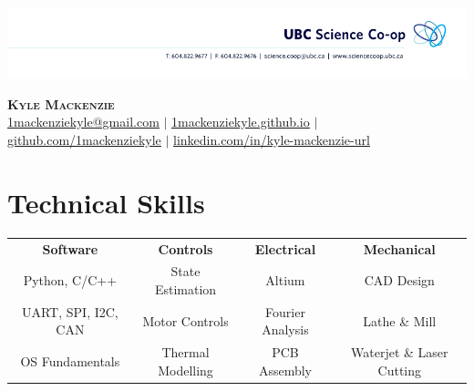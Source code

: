 \documentclass[letterpaper,11pt]{article}
\begin{document}

\begin{center}
\vspace*{-1.5cm}
    \centerline{\includegraphics[width=\paperwidth]{head}}
    \textbf{\Huge \scshape Kyle Mackenzie} \\ \vspace{1pt}
    \href{mailto:1mackenziekyle@gmail.com}{\underline{1mackenziekyle@gmail.com}} $|$
    \small \href{https://1mackenziekyle.github.io}{\underline{1mackenziekyle.github.io}} $|$
    \small \href{https://github.com/1mackenziekyle}{\underline{github.com/1mackenziekyle}} $|$
    \href{https://www.linkedin.com/in/kyle-mackenzie-url/}{\underline{linkedin.com/in/kyle-mackenzie-url}}  
    
    
\end{center}

 
  
%
\section{Technical Skills}
\begin{center}
    \begin{tabular*}{\textwidth}{@{\extracolsep{\fill}}cccc}
        \textbf{Software} & \textbf{Controls} & \textbf{Electrical} & \textbf{Mechanical} \\
        Python, C/C++ & State Estimation & Altium & CAD Design \\
        UART, SPI, I2C, CAN & Motor Controls & Fourier Analysis & Lathe \& Mill \\
        OS Fundamentals & Thermal Modelling & PCB Assembly & Waterjet \& Laser Cutting \\
    \end{tabular*}
\end{center}
\end{document}

